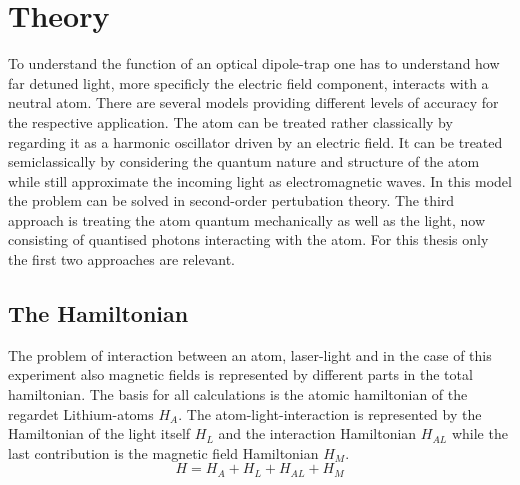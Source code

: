 \chapter{Theory}

To understand the function of an optical dipole-trap one has to understand how far detuned light, more specificly the electric field component, interacts with a neutral atom. There are several models providing different levels of accuracy for the respective application. The atom can be treated rather classically by regarding it as a harmonic oscillator driven by an electric field. It can be treated semiclassically by considering the quantum nature and structure of the atom while still approximate the incoming light as electromagnetic waves. In this model the problem can be solved in second-order pertubation theory. The third approach is treating the atom quantum mechanically as well as the light, now consisting of quantised photons interacting with the atom. For this thesis only the first two approaches are relevant. 

\section{The Hamiltonian}

The problem of interaction between an atom, laser-light and in the case of this experiment also magnetic fields is represented by different parts in the total hamiltonian. The basis for all calculations is the atomic hamiltonian of the regardet Lithium-atoms $H_A$. The atom-light-interaction is represented by the Hamiltonian of the light itself $H_L$ and the interaction Hamiltonian $H_{AL}$ while the last contribution is the magnetic field Hamiltonian $H_M$.
\begin{equation}
H=H_A+H_L+H_{AL}+H_{M}
\end{equation}\label{hamiltonian}

